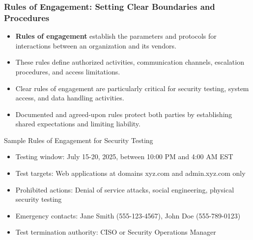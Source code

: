 \documentclass{beamer}
\begin{document}
\begin{frame}
    \frametitle{Rules of Engagement: Setting Clear Boundaries and Procedures}
    
    \begin{itemize}
        \item \textbf{Rules of engagement} establish the parameters and protocols for interactions between an organization and its vendors.
        \item These rules define authorized activities, communication channels, escalation procedures, and access limitations.
        \item Clear rules of engagement are particularly critical for security testing, system access, and data handling activities.
        \item Documented and agreed-upon rules protect both parties by establishing shared expectations and limiting liability.
    \end{itemize}
    
    \begin{exampleblock}{Sample Rules of Engagement for Security Testing}
        \scriptsize
        \begin{itemize}
            \item Testing window: July 15-20, 2025, between 10:00 PM and 4:00 AM EST
            \item Test targets: Web applications at domains xyz.com and admin.xyz.com only
            \item Prohibited actions: Denial of service attacks, social engineering, physical security testing
            \item Emergency contacts: Jane Smith (555-123-4567), John Doe (555-789-0123)
            \item Test termination authority: CISO or Security Operations Manager
        \end{itemize}
    \end{exampleblock}
\end{frame}
\end{document}
